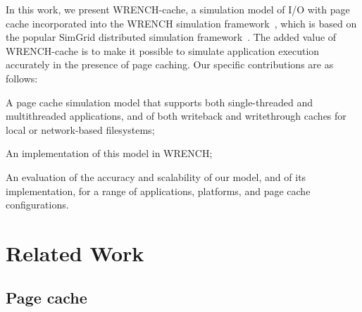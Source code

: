 \documentclass[conference]{IEEEtran}
\newcommand{\simgrid}{SimGrid\xspace}
\newcommand{\wrench}{WRENCH\xspace}
\begin{document}

    In this work, we present \wrench-cache, a simulation model of I/O
    with page cache incorporated into the \wrench simulation framework~\cite{casanova2020fgcs},
    which is  based on the popular \simgrid distributed simulation framework~\cite{casanova2014simgrid}.
    The added value of \wrench-cache is to make it possible to simulate 
        application execution accurately in the presence of page caching. Our specific 
        contributions are as follows:
    \begin{compactitem}
        \item A page cache simulation model that supports 
    both single-threaded and multithreaded applications, and of both
    writeback and writethrough caches for local or network-based
    filesystems;
        \item An implementation of this model in \wrench; 
        \item An evaluation of the accuracy and scalability of our model, and of its implementation,
              for a range of applications, platforms, and page cache configurations. 
    \end{compactitem}


    \section{Related Work}
    \label{relatedwork}

        \subsection{Page cache}
\end{document}
